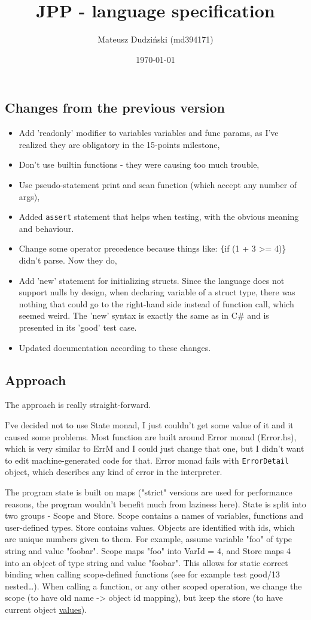 \documentclass[11pt]{article}
\author{Mateusz Dudziński (md394171)}
\date{\today}
\title{JPP - language specification}
\begin{document}
\maketitle

\subsection*{Changes from the previous version}
\label{sec:orgdbfd06f}
\begin{itemize}
\item Add 'readonly' modifier to variables variables and func params, as I've
realized they are obligatory in the 15-points milestone,
\item Don't use builtin functions - they were causing too much trouble,
\item Use pseudo-statement print and scan function (which accept any number of
args),
\item Added \texttt{assert} statement that helps when testing, with the obvious
meaning and behaviour.
\item Change some operator precedence because things like: \texttt\{if (1 + 3 >=
4)\} didn't parse. Now they do,
\item Add 'new' statement for initializing structs. Since the language does not
support nulls by design, when declaring variable of a struct type, there was
nothing that could go to the right-hand side instead of function call, which
seemed weird. The 'new' syntax is exactly the same as in C\# and is presented
in its 'good' test case.
\item Updated documentation according to these changes.
\end{itemize}
\subsection*{Approach}
\label{sec:org3a1f7f9}
The approach is really straight-forward.

I've decided not to use State monad, I just couldn't get some value of it and
it caused some problems. Most function are built around Error monad
(Error.hs), which is very similar to ErrM and I could just change that one,
but I didn't want to edit machine-generated code for that. Error monad fails
with \texttt{ErrorDetail} object, which describes any kind of error in the
interpreter.

The program state is built on maps ("strict" versions are used for
performance reasons, the program wouldn't benefit much from laziness here).
State is split into two groups - Scope and Store. Scope contains a names of
variables, functions and user-defined types. Store contains values. Objects
are identified with ids, which are unique numbers given to them. For example,
assume variable "foo" of type string and value "foobar". Scope maps "foo"
into VarId = 4, and Store maps 4 into an object of type string and value
"foobar". This allows for static correct binding when calling scope-defined
functions (see for example test good/13 nested\ldots{}). When calling a function,
or any other scoped operation, we change the scope (to have old name ->
object id mapping), but keep the store (to have current object \uline{values}).
\end{document}
